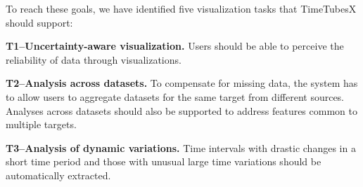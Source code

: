 
To reach these goals, we have identified five visualization tasks that TimeTubesX should support:

\noindent\textbf{T1--Uncertainty-aware visualization.} 
Users should be able to perceive the reliability of data through visualizations. 

\noindent\textbf{T2--Analysis across datasets.} 
To compensate for missing data, 
the system has to allow users to aggregate datasets for the same target from different sources.
Analyses across datasets should also be supported to address features common to multiple targets.

\noindent\textbf{T3--Analysis of dynamic variations.} 
Time intervals with drastic changes in a short time period and those with unusual large time variations should be automatically extracted.


